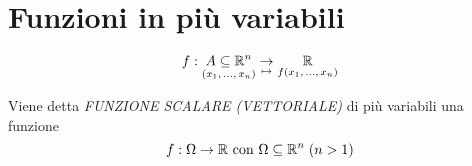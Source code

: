 \section{Funzioni in più variabili}
\begin{equation}
    f: \underset{(x_1, \, \dotsc, \, x_n)}{A \subseteq \mathbb{R}^n} \underset{\mapsto}{\to} \underset{f(x_1, \, \dotsc, \, x_n)}{\mathbb{R}}
\end{equation}

\begin{definition}
    Viene detta \emph{FUNZIONE SCALARE (VETTORIALE)} di più variabili una funzione
    \begin{equation}
        f: \Omega \to \mathbb{R}  \mbox{ con } \Omega \subseteq \mathbb{R}^n \; (n>1)
    \end{equation}
\end{definition}

